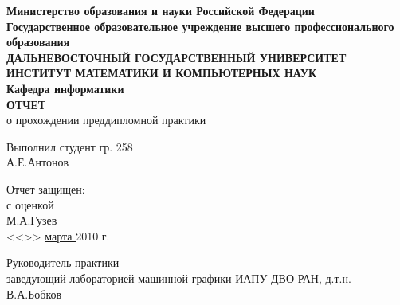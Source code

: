 \documentclass[a4paper,14pt,russian]{article}
\begin{document}

\begin{titlepage} %

\begin{center}
\textbf{Министерство образования и науки Российской Федерации\\
Государственное образовательное учреждение высшего профессионального образования\\
ДАЛЬНЕВОСТОЧНЫЙ ГОСУДАРСТВЕННЫЙ УНИВЕРСИТЕТ\\
ИНСТИТУТ МАТЕМАТИКИ И КОМПЬЮТЕРНЫХ НАУК\\
Кафедра информатики}\\
\textbf{ОТЧЕТ}\\
о прохождении преддипломной практики\\
\end{center}

\begin{flushright} %
\begin{minipage}{0.4\textwidth}
\begin{flushleft} %
Выполнил студент гр. 258\\ %
\underline{ } А.Е.Антонов\\ %
\end{flushleft}
\end{minipage}
\end{flushright}

\begingroup
\begin{minipage}{0.4\textwidth}
\begin{flushleft}
Отчет защищен:\\
с оценкой \\
М.А.Гузев\\
<<>> \underline{ марта }2010 г.
\end{flushleft}
\end{minipage}

\begin{minipage}{0.4\textwidth}
\begin{flushleft} %
Руководитель практики\\
заведующий лабораторией машинной графики ИАПУ ДВО РАН, д.т.н.\\
\underline{ }В.А.Бобков
\end{flushleft} %
\end{minipage} %
\endgroup


\end{titlepage}
\end{document}
